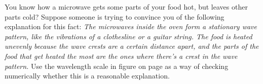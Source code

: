You know how a microwave gets some parts of your food hot, but leaves other parts cold?
Suppose someone is trying to convince you of the following explanation for this fact:
\emph{The microwaves inside the oven form a stationary wave pattern, like the vibrations
of a clothesline or a guitar string. The food is heated unevenly because
the wave crests are a certain
distance apart, and the parts of the food that get heated the most are the ones where there's
a crest in the wave pattern.} Use the wavelength scale in figure  on
page \pageref{fig:em-spectrum} as a way of checking numerically
whether this is a reasonable explanation.
